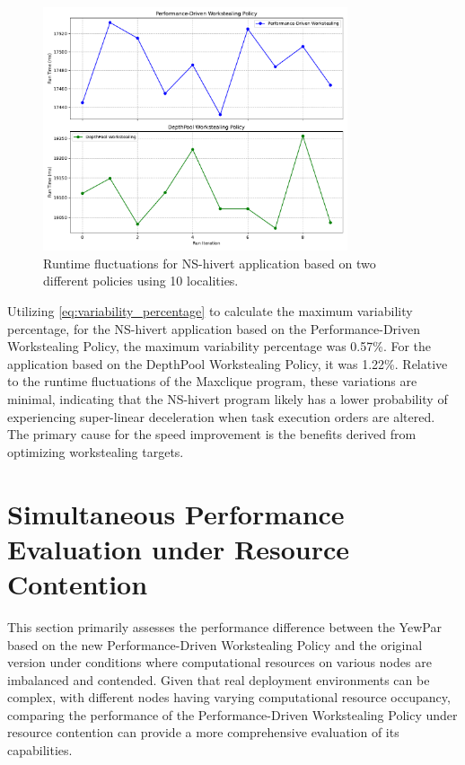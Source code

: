 \documentclass{mproj}
\begin{document}
\begin{figure}[h]
    \centering
    \includegraphics[width=0.8\textwidth]{images/NS_hivert_fluctuations.pdf}
    \caption{Runtime fluctuations for NS-hivert application based on two different policies using 10 localities.}
    \label{fig:NS_hivert_fluctuations}
\end{figure}
\FloatBarrier

Utilizing \ref{eq:variability_percentage} to calculate the maximum variability percentage,
for the NS-hivert application based on the Performance-Driven Workstealing Policy,
the maximum variability percentage was 0.57\%.
For the application based on the DepthPool Workstealing Policy, it was 1.22\%.
Relative to the runtime fluctuations of the Maxclique program, these variations are minimal,
indicating that the NS-hivert program likely has a lower probability of experiencing super-linear deceleration when task execution orders are altered.
The primary cause for the speed improvement is the benefits derived from optimizing workstealing targets.

\section{Simultaneous Performance Evaluation under Resource Contention}

This section primarily assesses the performance difference between the YewPar based on the new Performance-Driven Workstealing Policy and the original version under conditions where computational resources on various nodes are imbalanced and contended.
Given that real deployment environments can be complex, with different nodes having varying computational resource occupancy,
comparing the performance of the Performance-Driven Workstealing Policy under resource contention can provide a more comprehensive evaluation of its capabilities.
\end{document}
